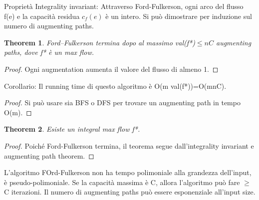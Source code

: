 \documentclass{article}
\newtheorem{theorem}{Theorem}[subsection]
\begin{document}
Proprietà Integrality invariant: Attraverso Ford-Fulkerson, ogni arco del flusso f(e) e la capacità residua $c_f(e)$ è un intero. Si può dimostrare per induzione sul numero di augmenting paths.
\begin{theorem}
    Ford–Fulkerson termina dopo al massimo val(f*)$\leq nC$ augmenting paths, dove f* è un max flow.
\end{theorem}
\begin{proof}
    Ogni augmentation aumenta il valore del flusso di almeno 1.
\end{proof}
Corollario: Il running time di questo algoritmo è O(m val(f*))=O(mnC).
\begin{proof}
    Si può usare sia BFS o DFS per trovare un augmenting path in tempo O(m).
\end{proof}
\begin{theorem}
    Esiste un integral max flow f*.
\end{theorem}
\begin{proof}
    Poiché Ford-Fulkerson termina, il teorema segue dall'integrality invariant e augmenting path theorem.
\end{proof}
L'algoritmo FOrd-Fulkerson non ha tempo polimoniale alla grandezza dell'input, è pseudo-polimoniale. Se la capacità massima è C, allora l'algoritmo può fare $\geq$C iterazioni. Il numero di augmenting paths può essere esponenziale all'input size.
\end{document}
